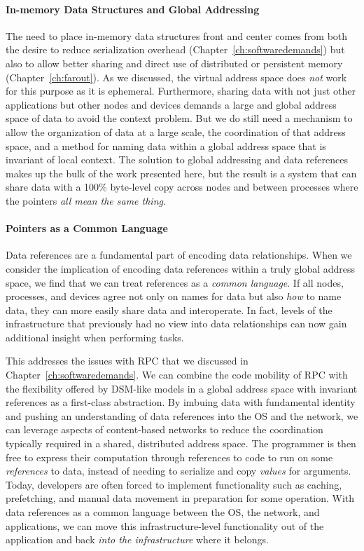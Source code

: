 \paragraph{In-memory Data Structures and Global Addressing}
The need to place in-memory data structures front and center comes from both the desire to reduce serialization
overhead (Chapter~\ref{ch:softwaredemands}) but also to allow better sharing and direct use of distributed or persistent
memory (Chapter~\ref{ch:farout}). As we discussed, the virtual address space does \emph{not} work for this
purpose as it is ephemeral.
Furthermore, sharing data with not just other applications but other nodes and devices demands a large and global
address space of data to avoid the context problem. But
we do still need a mechanism to allow the organization of data at a large scale, the coordination of that address space,
and a method for naming data within a global address space that is invariant of local context. The solution to global
addressing and data references makes up the bulk of the work presented here, but the result is a system that can share
data with a 100\% byte-level copy across nodes and between processes where the pointers \emph{all mean the same thing}.


\paragraph{Pointers as a Common Language} Data references are a fundamental part of encoding data relationships. When we consider the implication of encoding data references within a truly global
address space, we find that we can treat references as a \emph{common language}. If all nodes, processes, and devices
agree not only on names for data but also \emph{how} to name data, they can more easily share data and interoperate. In
fact, levels of the infrastructure that previously had no view into data relationships can now gain additional insight
when performing tasks.

This addresses the issues with RPC that we discussed in Chapter~\ref{ch:softwaredemands}.
We can combine the code mobility of RPC with the flexibility offered by
DSM-like models in a global address space with invariant references as a first-class abstraction. By
imbuing data with fundamental identity and pushing an understanding of data references into the OS
and the network, we can leverage aspects of content-based networks to reduce the coordination
typically required in a shared, distributed address space. The programmer is then free to express
their computation through references to code to run on some \emph{references} to data, instead
of needing to serialize and copy \emph{values} for arguments.
Today, developers are often forced to implement functionality such as caching, prefetching, and
manual data movement in preparation for some operation.
With data references as a common
language between the OS, the network, and applications, we can move this infrastructure-level functionality
out of the application and back \emph{into the infrastructure} where it belongs.

